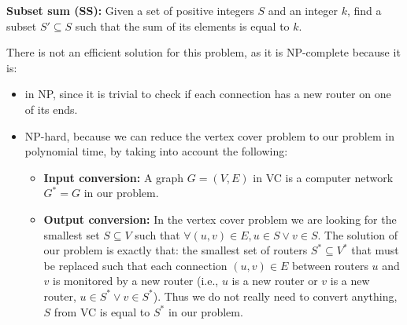 {\textbf{Subset sum (SS):} Given a set of positive integers $S$ and an integer $k$, find a subset $S' \subseteq S$ such that the sum of its elements is equal to $k$.

\ansseparator

There is not an efficient solution for this problem, as it is NP-complete because it is:
\begin{itemize}
    \item in NP, since it is trivial to check if each connection has a new router on one of its ends.
    \item NP-hard, because we can reduce the vertex cover problem to our problem in polynomial time, by taking into account the following:
    \begin{itemize}
        \item \textbf{Input conversion:} A graph $G=(V,E)$ in VC is a computer network $G^* = G$ in our problem.
        \item \textbf{Output conversion:} In the vertex cover problem we are looking for the smallest set $S \subseteq V$ such that $\forall (u,v) \in E, u \in S \vee v \in S$. The solution of our problem is exactly that: the smallest set of routers $S^* \subseteq V^*$ that must be replaced such that each connection $(u,v) \in E$ between routers $u$ and $v$ is monitored by a new router (i.e., $u$ is a new router or $v$ is a new router, $u \in S^* \vee v \in S^*$). Thus we do not really need to convert anything, $S$ from VC is equal to $S^*$ in our problem.
    \end{itemize}
\end{itemize}

}
